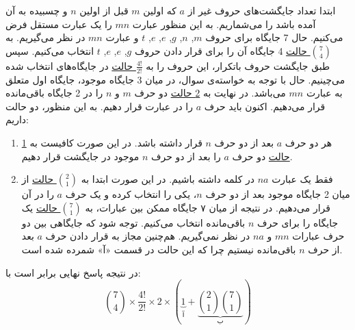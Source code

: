 \p
ابتدا تعداد جایگشت‌های  حروف غیر از 
$a$ که اولین $m$
 قبل از اولین $n$ 
 و چسبیده به آن آمده ‌باشد را می‌شماریم.
به این منظور عبارت $mn$ را یک عبارت مستقل فرض می‌کنیم.
حال 7 جایگاه برای حروف
$m$, 
$n$, 
$g$, 
$e$, 
$e$, 
$t$
و عبارت
 $mn$ 
در نظر می‌گیریم. 
به 
\underline{${7\choose 4}$ حالت}
 4 جایگاه آن را برای قرار دادن حروف 
$g$, 
$e$, 
$e$, 
$t$
انتخاب می‌کنیم.
 سپس طبق جایگشت حروف باتکرار، این حروف را به
 \underline{$\frac{4!}{2!}$ حالت}
در جایگاه‌های انتخاب شده می‌چینیم.
حال با توجه به خواسته‌ی سوال، در میان 3 جایگاه موجود،  
جایگاه اول متعلق به عبارت
 $mn$ می‌باشد.
  در نهایت به
 \underline{2 حالت}
 دو حرف
 $m$ و $n$
را در 2 جایگاه باقی‌مانده 
 قرار می‌دهیم.
اکنون باید حرف $a$ را در عبارت قرار دهیم.
به این منظور، دو حالت داریم:
\begin{enumerate}
  \item 
  
  هر دو حرف 
  $a$ بعد از دو حرف
  $n$ قرار داشته باشد. در این صورت کافیست به
  \underline{1 حالت}
  دو حرف 
  $a$ را بعد از دو حرف
  $n$ 
  موجود در جایگشت قرار دهیم.
  \item
  
  فقط یک عبارت 
  $na$
  در کلمه داشته‌ باشیم. در این صورت ابتدا به
  \underline{${2\choose 1}$ حالت}
  از میان 2 جایگاه موجود بعد از دو حرف
  $n$،  
  یکی را انتخاب کرده و یک حرف
  $a$
   را در آن قرار می‌دهیم. 
    در نتیجه از میان ۷ جایگاه ممکن بین عبارات،
   به
   \underline{${7\choose 1}$ حالت}
   یک جایگاه را برای حرف 
   $n$ باقی‌مانده انتخاب می‌کنیم.
   توجه شود که جایگاهی بین دو حرف عبارات 
   $mn$ و $na$ 
   در نظر نمی‌گیریم.
   هم‌چنین مجاز به قرار دادن حرف 
   $a$ بعد از حرف $n$
    باقی‌مانده نیستیم چرا که این حالت در قسمت «آ» شمرده شده است.
\end{enumerate}
\p
در نتیجه پاسخ نهایی برابر است با:
$${7\choose 4} \times \frac{4!}{2!} \times 2 \times (\underbrace{1}_{\text{آ}} + \underbrace{{2\choose 1}{7\choose 1}}_{\text{ب}})$$
